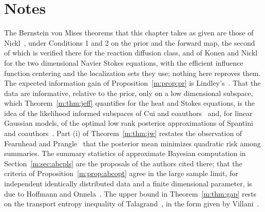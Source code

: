 \section*{Notes}

The Bernstein von Mises theorems that this chapter takes as given are those of Nickl~\cite{nicklbvm2024}, under Conditions 1 and 2 on the prior and the forward map, the second of which is verified there for the reaction diffusion class, and of Konen and Nickl~\cite{konennickl2026} for the two dimensional Navier Stokes equations, with the efficient influence function centering and the localization sets they use; nothing here reproves them. The expected information gain of Proposition~\ref{m:prop:pr} is Lindley's~\cite{lindley1956}. That the data are informative, relative to the prior, only on a low dimensional subspace, which Theorem~\ref{m:thm:jeff} quantifies for the heat and Stokes equations, is the idea of the likelihood informed subspaces of Cui and coauthors~\cite{cui2014} and, for linear Gaussian models, of the optimal low rank posterior approximations of Spantini and coauthors~\cite{spantini2015}. Part (i) of Theorem~\ref{m:thm:jw} restates the observation of Fearnhead and Prangle~\cite{fearnheadprangle2012} that the posterior mean minimizes quadratic risk among summaries. The summary statistics of approximate Bayesian computation in Section~\ref{m:sec:abcpls} are the proposals of the authors cited there; that the criteria of Proposition~\ref{m:prop:abcopt} agree in the large sample limit, for independent identically distributed data and a finite dimensional parameter, is due to Hoffmann and Onnela~\cite{hoffmannonnela2026}. The upper bound in Theorem~\ref{m:thm:gap} rests on the transport entropy inequality of Talagrand~\cite{talagrand1996}, in the form given by Villani~\cite{villani2009}.

